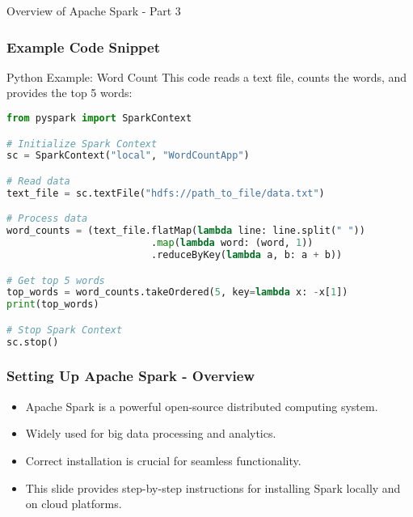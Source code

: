 \documentclass[aspectratio=169]{beamer}
\begin{document}
\begin{frame}[fragile]{Overview of Apache Spark - Part 3}
    \frametitle{Example Code Snippet}
    \begin{block}{Python Example: Word Count}
        This code reads a text file, counts the words, and provides the top 5 words:
        \begin{lstlisting}[language=Python]
from pyspark import SparkContext

# Initialize Spark Context
sc = SparkContext("local", "WordCountApp")

# Read data
text_file = sc.textFile("hdfs://path_to_file/data.txt")

# Process data
word_counts = (text_file.flatMap(lambda line: line.split(" "))
                         .map(lambda word: (word, 1))
                         .reduceByKey(lambda a, b: a + b))

# Get top 5 words
top_words = word_counts.takeOrdered(5, key=lambda x: -x[1])
print(top_words)

# Stop Spark Context
sc.stop()
        \end{lstlisting}
    \end{block}
\end{frame}

\begin{frame}[fragile]
    \frametitle{Setting Up Apache Spark - Overview}
    \begin{itemize}
        \item Apache Spark is a powerful open-source distributed computing system.
        \item Widely used for big data processing and analytics.
        \item Correct installation is crucial for seamless functionality.
        \item This slide provides step-by-step instructions for installing Spark locally and on cloud platforms.
    \end{itemize}
\end{frame}
\end{document}
